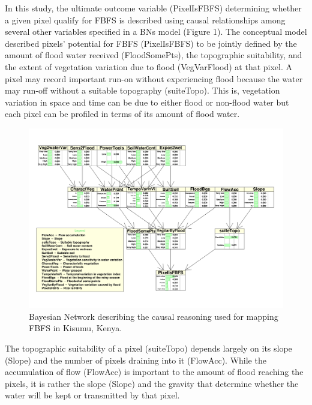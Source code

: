\documentclass[12pt,oneside]{article}
\begin{document}
In this study, the ultimate outcome variable (PixelIsFBFS) determining
whether a given pixel qualify for FBFS is described using causal
relationships among several other variables specified in a BNs model
(Figure 1). The conceptual model described pixels' potential for FBFS
(PixelIsFBFS) to be jointly defined by the amount of flood water
received (FloodSomePts), the topographic suitability, and the extent of
vegetation variation due to flood (VegVarFlood) at that pixel. A pixel
may record important run-on without experiencing flood because the water
may run-off without a suitable topography (suiteTopo). This is,
vegetation variation in space and time can be due to either flood or
non-flood water but each pixel can be profiled in terms of its amount of
flood water.

\begin{figure}
\includegraphics[width=1\linewidth]{figures/Mapping_FBFS_bayesian_network} \caption{Bayesian Network describing the causal reasoning used for mapping FBFS in Kisumu, Kenya.}\label{fig:fig1}
\end{figure}

The topographic suitability of a pixel (suiteTopo) depends largely on
its slope (Slope) and the number of pixels draining into it (FlowAcc).
While the accumulation of flow (FlowAcc) is important to the amount of
flood reaching the pixels, it is rather the slope (Slope) and the
gravity that determine whether the water will be kept or transmitted by
that pixel.
\end{document}
